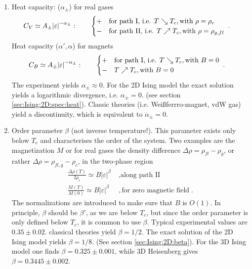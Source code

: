 \begin{enumerate}
	\item Heat capacity: ($\alpha_{\pm}$) for real gases 
%
\begin{align}\label{eq:heat:capacity}
C_{V}&\simeq A_{\pm} \abs{\varepsilon}^{-\alpha_{\pm}}
:\qquad\begin{cases}
+ &\text{for path I, i.e. } T \searrow 	T_{c}, \text{with } \rho=\rho_{c} \\
- &\text{for path II, i.e. } T \nearrow 	T_{c}, \text{with } \rho=\rho_{g,fl}
\end{cases}\;.
\end{align}
%
Heat capacity ($\alpha',\alpha$) for magnets
\begin{align}\label{eq:}
C_{B}&\simeq  A_{\pm} \abs{\varepsilon}^{-\alpha_{\pm}}
:\qquad \begin{cases}
+ &\text{for path I, i.e. } T \searrow 	T_{c}, \text{with } B=0 \\
- & T \nearrow 	T_{c}, \text{with } B=0
\end{cases}\;.
\end{align}
The experiment yields $\alpha_{\pm}\approx 0$. For the 2D Ising model the exact solution yields a logarithmic divergence, i.e. $\alpha_{\pm}=0$. 
{\color{blue}(see section \ref{sec:Ising:2D:spec:heat}).}
Classic theories (i.e. Weißferrro-magnet, vdW gas) yield a discontinuity,
which is equivalent to $\alpha_{\pm}=0$.
\item Order parameter $\beta$ (not inverse temperature!). This parameter exists only below $T_{c}$ and characterises the order of the system.
Two examples are the magnetization $M$ or for real gases the density difference 
$\Delta \rho = \rho_{fl}-\rho_{g}$, or rather $\Delta \rho = \rho_{fl,g}-\rho_{c}$, in the 
two-phase region
%
%
\begin{align}\label{eq:}
\frac{\Delta \rho(T)}{2 \rho_{c}} \simeq B|\varepsilon|^{\beta}&\;,\text{along path II}\\
\frac{M(T)}{M(0)} \simeq B|\varepsilon|^{\beta}&\;,\text{for zero magnetic field} \;.
\end{align}
%
The normalizations are introduced to make sure that $B$ is $O(1)$.
In principle, $\beta$ should be $\beta'$, as we are below $T_{c}$, but since the order parameter 
is only defined below $T_{c}$, it is common to use $\beta$. Typical experimental values are $0.35\pm 0.02$. classical theories yield $\beta=1/2$. The exact solution of the 2D Ising model yields $\beta=1/8$. {\color{blue}(See section \ref{sec:Ising:2D:beta}).}
For the 3D Ising model one finds $\beta=0.325\pm 0.001$, while 3D Heisenberg gives $\beta=0.3445\pm 0.002$.


\end{enumerate}

